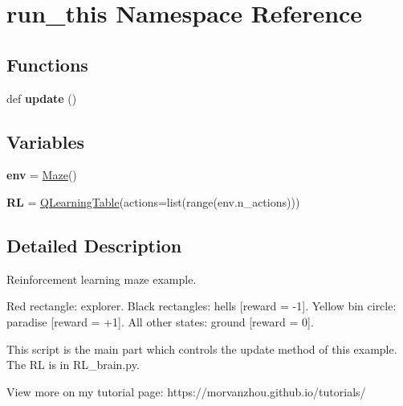 \hypertarget{namespacerun__this}{}\section{run\+\_\+this Namespace Reference}
\label{namespacerun__this}
\subsection*{Functions}
\begin{DoxyCompactItemize}
\item 
\mbox{\label{namespacerun__this_a6ab3cf4f3e1be4fc183d43cddc8dae53}} 
def {\bfseries update} ()
\end{DoxyCompactItemize}
\subsection*{Variables}
\begin{DoxyCompactItemize}
\item 
\mbox{\label{namespacerun__this_a0f5db3e1ffb5f497763d6606c649af6c}} 
{\bfseries env} = \mbox{\hyperlink{classmaze__env_1_1Maze}{Maze}}()
\item 
\mbox{\label{namespacerun__this_a5feda1cc63b8c5f1f616fdc039fd618e}} 
{\bfseries RL} = \mbox{\hyperlink{classRL__brain_1_1QLearningTable}{Q\+Learning\+Table}}(actions=list(range(env.\+n\+\_\+actions)))
\end{DoxyCompactItemize}


\subsection{Detailed Description}
\begin{DoxyVerb}Reinforcement learning maze example.

Red rectangle:          explorer.
Black rectangles:       hells       [reward = -1].
Yellow bin circle:      paradise    [reward = +1].
All other states:       ground      [reward = 0].

This script is the main part which controls the update method of this example.
The RL is in RL_brain.py.

View more on my tutorial page: https://morvanzhou.github.io/tutorials/
\end{DoxyVerb}
 